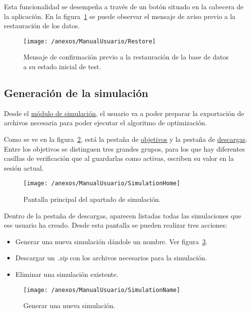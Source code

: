 Esta funcionalidad se desempeña a través de un botón situado en la cabecera de la aplicación. En la figura~\ref{img:Restore} se puede observar el mensaje de aviso previo a la restauración de los datos.

\begin{figure}[h]
	\centering
	\texttt{[image: /anexos/ManualUsuario/Restore]}
	\caption{Mensaje de confirmación previo a la restauración de la base de datos a su estado inicial de test.}	\label{img:Restore}
\end{figure}

\newpage

\subsection{Generación de la simulación}

Desde el \href{https://www.proyectoubu.nesiweb.com/home/home-simulation}{módulo de simulación}, el usuario va a poder preparar la exportación de archivos necesaria para poder ejecutar el algoritmo de optimización.

Como se ve en la figura~\ref{img:SimulationHome}, está la pestaña de \href{https://www.proyectoubu.nesiweb.com/objectives/home}{objetivos} y la pestaña de \href{https://www.proyectoubu.nesiweb.com/simulations/home}{descargas}. Entre los objetivos se distinguen tres grandes grupos, para los que hay diferentes casillas de verificación que al guardarlas como activas, escriben su valor en la sesión actual.
\begin{figure}[h]
	\centering
	\texttt{[image: /anexos/ManualUsuario/SimulationHome]}
	\caption{Pantalla principal del apartado de simulación.}	
	\label{img:SimulationHome}
\end{figure}

Dentro de la pestaña de descargas, aparecen listadas todas las simulaciones que ese usuario ha creado. Desde esta pantalla se pueden realizar tres acciones:
\begin{itemize}
	\item Generar una nueva simulación dándole un nombre. Ver figura~\ref{img:SimulationName}.
	\item Descargar un \textit{.zip} con los archivos necesarios para la simulación.
	\item Eliminar una simulación existente.
\end{itemize}
\begin{figure}[h]
	\centering
	\texttt{[image: /anexos/ManualUsuario/SimulationName]}
	\caption{Generar una nueva simulación.}	
	\label{img:SimulationName}
\end{figure}

